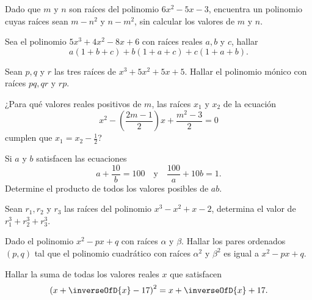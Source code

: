 \begin{multicols}{2}
    \begin{exercise}
        Dado que $m$ y $n$ son raíces del polinomio $6x^2 - 5x - 3$, encuentra un polinomio cuyas raíces sean
        $m - n^2$ y $n - m^2$, sin calcular los valores de $m$ y $n$.
    \end{exercise}

    \begin{exercise}
        Sea el polinomio $5x^3 + 4x^2 - 8x + 6$ con raíces reales $a, b$ y $c$, hallar
        \[
            a(1 + b + c) + b(1 + a + c) + c(1 + a + b).
        \]
    \end{exercise}

    \begin{exercise}
        Sean $p, q$ y $r$ las tres raíces de $x^3 + 5x^2 + 5x + 5$.
        Hallar el polinomio mónico con raíces $pq, qr$ y $rp$.
    \end{exercise}

    \begin{exercise}
        ¿Para qué valores reales positivos de $m$, las raíces $x_1$ y $x_2$ de la ecuación
        \[
            x^2 - \left( \frac{2m - 1}{2} \right)x  + \frac{m^2 - 3}{2} = 0
        \]
        cumplen que $x_1 = x_2 - \frac{1}{2}$?
    \end{exercise}

    \begin{exercise}
        Si $a$ y $b$ satisfacen las ecuaciones
        \[
            a + \frac{10}{b} = 100\quad \text{y} \quad \frac{100}{a} + 10b = 1.
        \]
        Determine el producto de todos los valores posibles de $ab$.
    \end{exercise}

    \begin{exercise}
        Sean $r_1, r_2$ y $r_3$ las raíces del polinomio $x^3 - x^2 + x - 2$, determina el valor de $r_1^3 + r_2^3 + r_3^3$.
    \end{exercise}

    \begin{exercise}
        Dado el polinomio $x^2 - px + q$ con raíces $\alpha$ y $\beta$.
        Hallar los pares ordenados $(p, q)$ tal que el polinomio cuadrático con raíces $\alpha^2$ y $\beta^2$ es igual a $x^2 - px + q$.
    \end{exercise}

    \begin{problem}
        Hallar la suma de todas los valores reales $x$ que satisfacen
        \[
            \left(x + \inverseOfD{x} - 17\right)^2 = x + \inverseOfD{x} + 17.
        \]
    \end{problem}


\end{multicols}
